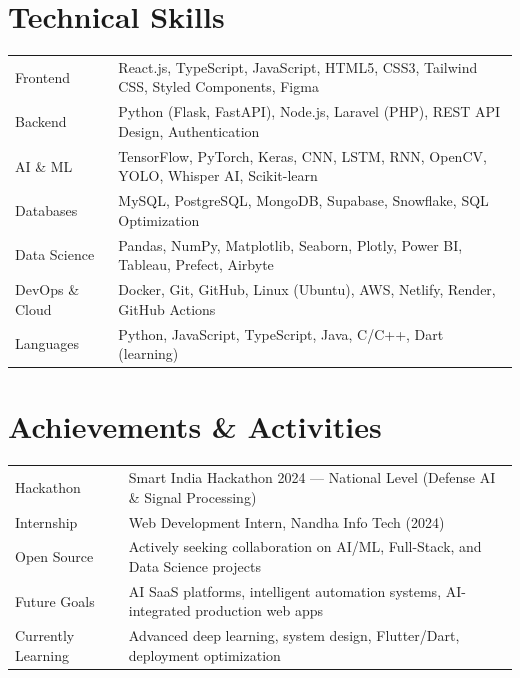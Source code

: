 \documentclass[a4paper,12pt]{article}
\begin{document}
\section{Technical Skills}
\begin{tabularx}{\linewidth}{@{}l X@{}}
Frontend          & \normalsize{React.js, TypeScript, JavaScript, HTML5, CSS3, Tailwind CSS, Styled Components, Figma} \\
Backend           & \normalsize{Python (Flask, FastAPI), Node.js, Laravel (PHP), REST API Design, Authentication} \\
AI \& ML          & \normalsize{TensorFlow, PyTorch, Keras, CNN, LSTM, RNN, OpenCV, YOLO, Whisper AI, Scikit-learn} \\
Databases         & \normalsize{MySQL, PostgreSQL, MongoDB, Supabase, Snowflake, SQL Optimization} \\
Data Science      & \normalsize{Pandas, NumPy, Matplotlib, Seaborn, Plotly, Power BI, Tableau, Prefect, Airbyte} \\
DevOps \& Cloud   & \normalsize{Docker, Git, GitHub, Linux (Ubuntu), AWS, Netlify, Render, GitHub Actions} \\
Languages         & \normalsize{Python, JavaScript, TypeScript, Java, C/C++, Dart (learning)} \\
\end{tabularx}

\section{Achievements \& Activities}
\begin{tabularx}{\linewidth}{@{}l X@{}}
Hackathon       & Smart India Hackathon 2024 --- National Level (Defense AI \& Signal Processing) \\
Internship      & Web Development Intern, Nandha Info Tech (2024) \\
Open Source     & Actively seeking collaboration on AI/ML, Full-Stack, and Data Science projects \\
Future Goals    & AI SaaS platforms, intelligent automation systems, AI-integrated production web apps \\
Currently Learning & Advanced deep learning, system design, Flutter/Dart, deployment optimization \\
\end{tabularx}

\end{document}
